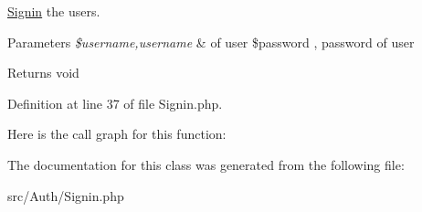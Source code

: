 \mbox{\hyperlink{class_zest_1_1_auth_1_1_signin}{Signin}} the users.


\begin{DoxyParams}{Parameters}
{\em \$username,username} & of user \$password , password of user\\
\hline
\end{DoxyParams}
\begin{DoxyReturn}{Returns}
void 
\end{DoxyReturn}


Definition at line 37 of file Signin.\+php.

Here is the call graph for this function\+:


The documentation for this class was generated from the following file\+:\begin{DoxyCompactItemize}
\item 
src/\+Auth/Signin.\+php\end{DoxyCompactItemize}
